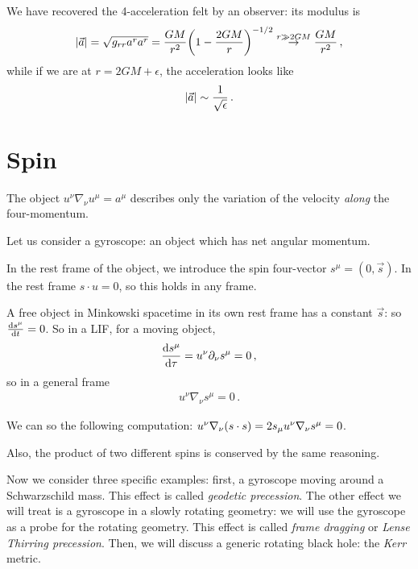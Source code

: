 \documentclass[main.tex]{subfiles}
\begin{document}
We have recovered the 4-acceleration felt by an observer: its modulus is 
%
\begin{align}
  \abs{\vec{a}} = \sqrt{g_{rr} a^{r} a^{r}} = \frac{GM}{r^2} \qty(1 - \frac{2GM}{r})^{-1/2} \overset{r \gg 2GM}{\rightarrow} \frac{GM}{r^2}
\,,
\end{align}
% 
while if we are at \(r = 2GM + \epsilon \), the acceleration looks like 
%
\begin{align}
  \abs{\vec{a}} \sim \frac{1}{\sqrt{ \epsilon }}
\,.
\end{align}

\section{Spin}

The object \(u^{\nu } \nabla_{\nu } u^{\mu  } = a^{\mu } \) describes only the variation of the velocity \emph{along} the four-momentum. 

Let us consider a gyroscope: an object which has net angular momentum. 

In the rest frame of the object, we introduce the spin four-vector \(s^{\mu } = (0, \vec{s})\). 
In the rest frame \(s \cdot u = 0\), so this holds in any frame. 

A free object in Minkowski spacetime in its own rest frame has a constant \(\vec{s}\): so \(\dv{s^{\mu }}{t} = 0\). 
So in a LIF, for a moving object, 
%
\begin{align}
  \dv{s^{\mu }}{\tau } = u^{\nu } \partial_{\nu } s^{\mu } = 0
\,,
\end{align}
%
so in a general frame 
%
\begin{align}
  u^{\nu } \nabla_{\nu } s^{\mu } = 0
\,.
\end{align}

We can so the following computation: \( u^{\nu } \nabla_{\nu } \qty(s \cdot s )= 2 s_{\mu } u^{\nu } \nabla_{\nu } s^{\mu } = 0\). 

Also, the product of two different spins is conserved by the same reasoning. 

Now we consider three specific examples: first, a gyroscope moving around a Schwarzschild mass. 
This effect is called \emph{geodetic precession}. 
The other effect we will treat is a gyroscope in a slowly rotating geometry: we will use the gyroscope as a probe for the rotating geometry.
This effect is called \emph{frame dragging} or \emph{Lense Thirring precession}. 
Then, we will discuss a generic rotating black hole: the \emph{Kerr} metric. 
\end{document}
